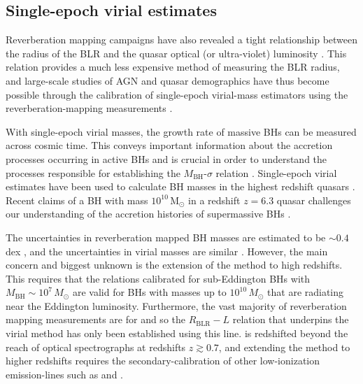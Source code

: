 \subsection{Single-epoch virial estimates}

Reverberation mapping campaigns have also revealed a tight relationship between the radius of the BLR and the quasar optical (or ultra-violet) luminosity \citep[the $R_{\text{BLR}}-L$ relation; e.g.][]{kaspi00,kaspi07}.
This relation provides a much less expensive method of measuring the BLR radius, and large-scale studies of AGN and quasar demographics \citep[e.g.][]{greene05b,vestergaard06,vestergaard09,shen11,shen12,trakhtenbrot12} have thus become possible through the calibration of single-epoch virial-mass estimators using the reverberation-mapping measurements \citep[e.g.][]{vestergaard02,mclure02,vestergaard06,mcgill08,wang09,rafiee11,park13}.

With single-epoch virial masses, the growth rate of massive BHs can be measured across cosmic time.
This conveys important information about the accretion processes occurring in active BHs \citep[e.g.][]{kollmeier06} and is crucial in order to understand the processes responsible for establishing the $M_{\text{BH}}$-$\sigma$ relation \citep[e.g.][]{bennert11}.
Single-epoch virial estimates have been used to calculate BH masses in the highest redshift quasars \citep[e.g. a $10^9$\,M$_\odot$ BH in a redshift $z=7.1$ quasar;][]{mortlock11}.
Recent claims of a BH with mass $10^{10}$\,M$_\odot$ in a redshift $z=6.3$ quasar \citep[when the Universe is less than $1$ Gyr old;][]{wu15} challenges our understanding of the accretion histories of supermassive BHs \citep[e.g.][]{willott03}.

The uncertainties in reverberation mapped BH masses are estimated to be $\sim 0.4$\,dex \citep[e.g.][]{peterson10}, and the uncertainties in virial masses are similar \citep[e.g.][]{vestergaard06}.
However, the main concern and biggest unknown is the extension of the method to high redshifts.
This requires that the relations calibrated for sub-Eddington BHs with $M_{\text{BH}}\sim10^7\,M_\odot$ are valid for BHs with masses up to $10^{10}\,M_\odot$ that are radiating near the Eddington luminosity.
Furthermore, the vast majority of reverberation mapping measurements are for \hb and so the $R_{\text{BLR}}-L$ relation that underpins the virial method has only been established using this line.
\hb is redshifted beyond the reach of optical spectrographs at redshifts $z \gtrsim 0.7$, and extending the method to higher redshifts requires the secondary-calibration of other low-ionization emission-lines such as \ha and  \citep[e.g.][]{vestergaard02,mclure02,wu04,kollmeier06,onken08,wang09,rafiee11}.

